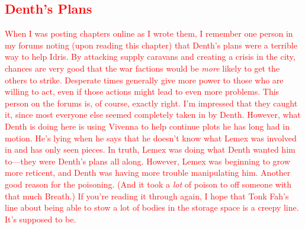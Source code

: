 \textcolor{red}{
\subsection*{Denth’s Plans}
}
\textcolor{red}{
When I was posting chapters online as I wrote them, I remember one person in my forums noting (upon reading this chapter) that Denth’s plans were a terrible way to help Idris. By attacking supply caravans and creating a crisis in the city, chances are very good that the war factions would be \textit{more} likely to get the others to strike. Desperate times generally give more power to those who are willing to act, even if those actions might lead to even more problems.
}
\textcolor{red}{
This person on the forums is, of course, exactly right. I’m impressed that they caught it, since most everyone else seemed completely taken in by Denth. However, what Denth is doing here is using Vivenna to help continue plots he has long had in motion. He’s lying when he says that he doesn’t know what Lemex was involved in and has only seen pieces. In truth, Lemex was doing what Denth wanted him to—they were Denth’s plans all along.
}
\textcolor{red}{
However, Lemex was beginning to grow more reticent, and Denth was having more trouble manipulating him. Another good reason for the poisoning. (And it took a \textit{lot} of poison to off someone with that much Breath.)
}
\textcolor{red}{
If you’re reading it through again, I hope that Tonk Fah’s line about being able to stow a lot of bodies in the storage space is a creepy line. It’s supposed to be.
}



